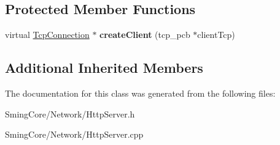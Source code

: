\subsection*{Protected Member Functions}
\begin{DoxyCompactItemize}
\item 
\hypertarget{class_http_server_a4f1d6dea4a489d13b9ef6e690090acb6}{}virtual \hyperlink{class_tcp_connection}{Tcp\+Connection} $\ast$ {\bfseries create\+Client} (tcp\+\_\+pcb $\ast$client\+Tcp)\label{class_http_server_a4f1d6dea4a489d13b9ef6e690090acb6}

\end{DoxyCompactItemize}
\subsection*{Additional Inherited Members}


The documentation for this class was generated from the following files\+:\begin{DoxyCompactItemize}
\item 
Sming\+Core/\+Network/Http\+Server.\+h\item 
Sming\+Core/\+Network/Http\+Server.\+cpp\end{DoxyCompactItemize}

